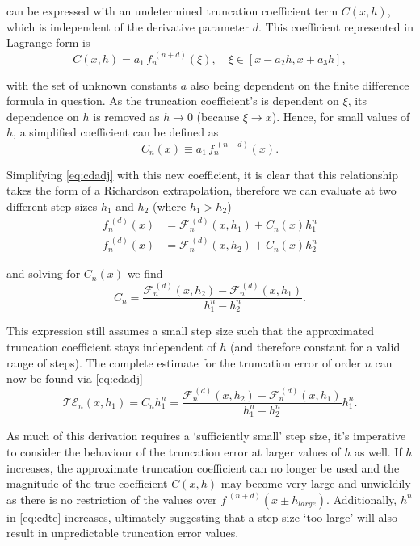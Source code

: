 can be expressed with an undetermined truncation coefficient term $C(x,h)$, which is independent of the derivative parameter $d$.
This coefficient represented in Lagrange form is
\begin{equation}
C(x,h) = a_1\,f_n^{\;(n+d)}(\xi), \quad \xi \in [x-a_2h,x+a_3h],\label{eq:cdcxh}
\end{equation}

with the set of unknown constants $a$ also being dependent on the finite difference formula in question.
As the truncation coefficient's is dependent on $\xi$, its dependence on $h$ is removed as $h\!\to\!0$ (because $\xi\!\to\!x$).
Hence, for small values of $h$, a simplified coefficient can be defined as
\begin{equation}
 C_n(x) \equiv a_1\,f_n^{\;(n+d)}(x).
\end{equation}

Simplifying \cref{eq:cdadj} with this new coefficient, it is clear that this relationship takes the form of a Richardson extrapolation, therefore we can evaluate at two different step sizes $h_1$ and $h_2$ (where $h_1 > h_2$)
\begin{align}
f_n^{\;(d)}(x) &= \mathcal{F}_n^{\,(d)}(x,h_1) + C_n(x)h_1^n \\
f_n^{\;(d)}(x) &= \mathcal{F}_n^{\,(d)}(x,h_2) + C_n(x)h_2^n
\end{align}

and solving for $C_n(x)$ we find
\begin{equation}
 C_n = \frac{\mathcal{F}_n^{\,(d)}(x,h_2) - \mathcal{F}_n^{\,(d)}(x,h_1)}{h_1^n - h_2^n}.\label{eq:cdtrcoeff}
\end{equation}

This expression still assumes a small step size such that the approximated truncation coefficient stays independent of $h$ (and therefore constant for a valid range of steps).
The complete estimate for the truncation error of order $n$ can now be found via \cref{eq:cdadj}
\begin{equation}
\mathcal{TE}_n(x,h_1) = C_n h_1^n = \frac{\mathcal{F}_n^{\,(d)}(x,h_2) - \mathcal{F}_n^{\,(d)}(x,h_1)}{h_1^n - h_2^n}h_1^n.\label{eq:cdte}
\end{equation}

As much of this derivation requires a `sufficiently small' step size, it's imperative to consider the behaviour of the truncation error at larger values of $h$ as well.
If $h$ increases, the approximate truncation coefficient can no longer be used and
the magnitude of the true coefficient $C(x,h)$ may become very large and unwieldily as there is no restriction of the values over $f^{\;(n+d)}(x\pm h_{large})$.
Additionally, $h^n$ in \cref{eq:cdte} increases, ultimately suggesting that a step size `too large' will also result in unpredictable truncation error values.


